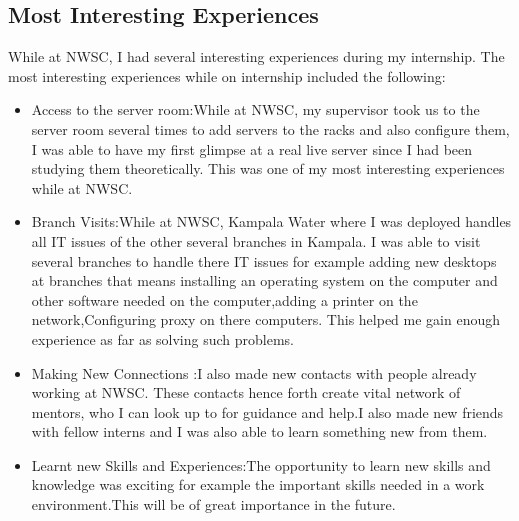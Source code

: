 \documentclass{article}
\begin{document}
\subsection{Most Interesting Experiences}
While at NWSC, I had several interesting experiences during my internship. The most interesting experiences while on internship included the following:\\
\begin{itemize}
\item Access to the server room:While at NWSC, my supervisor took us to the server room several times to add servers to the racks and also configure them, I was able to have my first glimpse at a real live server since I had been studying them theoretically. This was one of my most interesting experiences while at NWSC.
\item Branch Visits:While at NWSC, Kampala Water where I was deployed handles all IT issues of the other several branches in Kampala. I was able to visit several branches to handle there IT issues for example adding new desktops at branches that means installing an operating system on the computer and other software needed on the computer,adding a printer on the network,Configuring proxy on there computers. This helped me gain enough experience as far as solving such problems.
\item Making New Connections :I also made new contacts with people already working at NWSC. These contacts hence forth create vital network of mentors, who I can look up to for guidance and help.I also made new friends with fellow interns and I was also able to learn something new from them.
\item Learnt new Skills and Experiences:The opportunity to learn new skills and knowledge was exciting for example the important skills needed in a work environment.This will be of great importance in the future.
\end{itemize}
\end{document}

